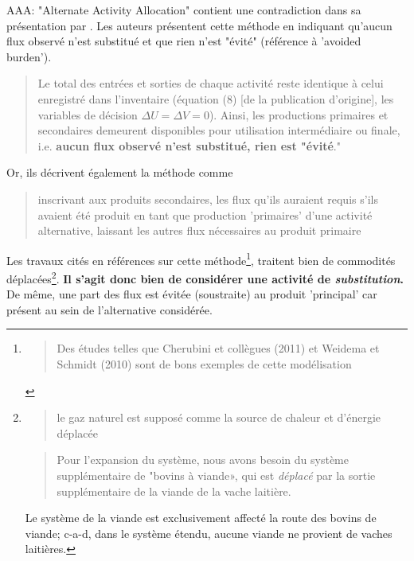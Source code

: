 AAA: "Alternate Activity Allocation" contient une contradiction dans sa présentation par \citeauthor{majeau-bettez_unified_2014}.
Les auteurs présentent cette méthode en indiquant qu'aucun flux observé n'est substitué et que rien n'est "évité" (référence à 'avoided burden').
\blockcquote[traduction]{majeau-bettez_unified_2014}{
Le total des entrées et sorties de chaque activité reste identique à celui enregistré dans l'inventaire (équation (8) [de la publication d'origine], les variables de décision $ \Delta U = \Delta V = 0 $). Ainsi, les productions primaires et secondaires demeurent disponibles pour utilisation intermédiaire ou finale, i.e. \textbf{aucun flux observé n'est substitué, rien est "évité}."
}
Or, ils décrivent également la méthode comme \blockcquote[traduction]{majeau-bettez_unified_2014}{
inscrivant aux produits secondaires, les flux qu'ils auraient requis s'ils avaient été produit en tant que production 'primaires' d'une activité alternative, laissant les autres flux nécessaires au produit primaire
}.
Les travaux cités en références sur cette méthode\footnote{
\blockcquote[traduction]{majeau-bettez_unified_2014}{
Des études telles que Cherubini et collègues (2011) et Weidema et Schmidt (2010) sont de bons exemples de cette modélisation
}},
traitent bien de commodités déplacées\footnote{
\blockcquote[traduction]{cherubini_influence_2011}{
le gaz naturel est supposé comme la source de chaleur et d'énergie déplacée
}.
\blockcquote[traduction]{weidema_avoiding_2010}{
Pour l'expansion du système, nous avons besoin du système supplémentaire de "bovins à viande», qui est \emph{déplacé} par la sortie supplémentaire de la viande de la vache laitière.}
Le système de la viande est exclusivement affecté la route des bovins de viande; c-a-d, dans le système étendu, aucune viande ne provient de vaches laitières.
}.
\textbf{Il s'agit donc bien de considérer une activité de \emph{substitution}.}
De même, une part des flux est évitée (soustraite) au produit 'principal' car présent au sein de l'alternative considérée.

